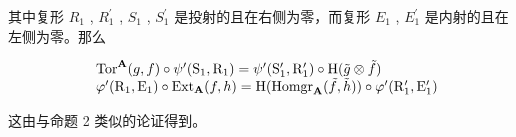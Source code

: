 其中复形 \(R_{1}\) , \(R_{1}^{\prime}\) , \(S_{1}\) , \(S_{1}^{\prime}\) 是投射的且在右侧为零，而复形 \(E_{1}\) , \(E_{1}^{\prime}\) 是内射的且在左侧为零。那么

\[
\begin{array}{r l} & {\mathrm{Tor} ^ {\mathbf {A}} (g, f) \circ \psi^ {\prime} (\mathrm{S} _ {1}, \mathrm{R} _ {1}) = \psi^ {\prime} (\mathrm{S} _ {1} ^ {\prime}, \mathrm{R} _ {1} ^ {\prime}) \circ \mathrm{H} (\tilde {g} \otimes \tilde {f})} \\ & {\varphi^ {\prime} (\mathrm{R} _ {1}, \mathrm{E} _ {1}) \circ \mathrm{Ext} _ {\mathbf {A}} (f, h) = \mathrm{H} (\mathrm{Homgr} _ {\mathbf {A}} (\tilde {f}, \tilde {h})) \circ \varphi^ {\prime} (\mathrm{R} _ {1} ^ {\prime}, \mathrm{E} _ {1} ^ {\prime})} \end{array}
\]

这由与命题 2 类似的论证得到。

